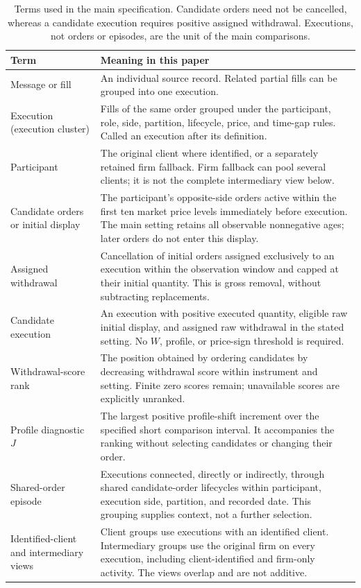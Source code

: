 \begin{table}[!htbp]
\centering
\caption{Terms used in the main specification. Candidate orders need not be cancelled, whereas a candidate execution requires positive assigned withdrawal. Executions, not orders or episodes, are the unit of the main comparisons.}
\label{tab:simple-terminology}
\begin{singlespace}
\renewcommand{\arraystretch}{1.18}
\begin{tabularx}{\textwidth}{@{}>{\raggedright\arraybackslash}p{}>{\raggedright\arraybackslash}X@{}}
\toprule
Term & Meaning in this paper \\
\midrule
Message or fill & An individual source record. Related partial fills can be grouped into one execution. \\
Execution (execution cluster) & Fills of the same order grouped under the participant, role, side, partition, lifecycle, price, and time-gap rules. Called an execution after its definition. \\
Participant & The original client where identified, or a separately retained firm fallback. Firm fallback can pool several clients; it is not the complete intermediary view below. \\
Candidate orders or initial display & The participant's opposite-side orders active within the first ten market price levels immediately before execution. The main setting retains all observable nonnegative ages; later orders do not enter this display. \\
Assigned withdrawal & Cancellation of initial orders assigned exclusively to an execution within the observation window and capped at their initial quantity. This is gross removal, without subtracting replacements. \\
Candidate execution & An execution with positive executed quantity, eligible raw initial display, and assigned raw withdrawal in the stated setting. No $W$, profile, or price-sign threshold is required. \\
Withdrawal-score rank & The position obtained by ordering candidates by decreasing withdrawal score within instrument and setting. Finite zero scores remain; unavailable scores are explicitly unranked. \\
Profile diagnostic $J$ & The largest positive profile-shift increment over the specified short comparison interval. It accompanies the ranking without selecting candidates or changing their order. \\
Shared-order episode & Executions connected, directly or indirectly, through shared candidate-order lifecycles within participant, execution side, partition, and recorded date. This grouping supplies context, not a further selection. \\
Identified-client and intermediary views & Client groups use executions with an identified client. Intermediary groups use the original firm on every execution, including client-identified and firm-only activity. The views overlap and are not additive. \\
\bottomrule
\end{tabularx}
\end{singlespace}
\end{table}
\FloatBarrier


